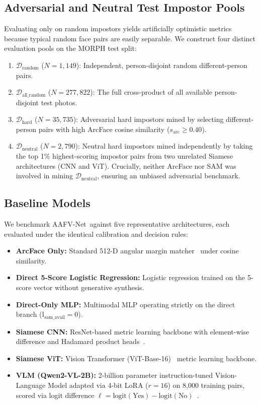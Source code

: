 \documentclass[10pt,journal,compsoc]{IEEEtran}
\newcommand{\sys}{AAFV-Net}
\begin{document}
\subsection{Adversarial and Neutral Test Impostor Pools}
Evaluating only on random impostors yields artificially optimistic metrics because typical random face pairs are easily separable. We construct four distinct evaluation pools on the MORPH test split:
\begin{enumerate}
    \item $\mathcal{D}_{\text{random}}$ ($N = 1{,}149$): Independent, person-disjoint random different-person pairs.
    \item $\mathcal{D}_{\text{all\_random}}$ ($N = 277{,}822$): The full cross-product of all available person-disjoint test photos.
    \item $\mathcal{D}_{\text{hard}}$ ($N = 35{,}735$): Adversarial hard impostors mined by selecting different-person pairs with high ArcFace cosine similarity ($s_{\text{arc}} \ge 0.40$).
    \item $\mathcal{D}_{\text{neutral}}$ ($N = 2{,}790$): Neutral hard impostors mined independently by taking the top 1\% highest-scoring impostor pairs from two unrelated Siamese architectures (CNN and ViT). Crucially, neither ArcFace nor SAM was involved in mining $\mathcal{D}_{\text{neutral}}$, ensuring an unbiased adversarial benchmark.
\end{enumerate}

\subsection{Baseline Models}
We benchmark \sys\ against five representative architectures, each evaluated under the identical calibration and decision rules:
\begin{itemize}
    \item \textbf{ArcFace Only:} Standard 512-D angular margin matcher~\cite{deng2019arcface} under cosine similarity.
    \item \textbf{Direct 5-Score Logistic Regression:} Logistic regression trained on the 5-score vector without generative synthesis.
    \item \textbf{Direct-Only MLP:} Multimodal MLP operating strictly on the direct branch ($\mathbb{I}_{\text{sam\_avail}} = 0$).
    \item \textbf{Siamese CNN:} ResNet-based metric learning backbone with element-wise difference and Hadamard product heads~\cite{chopra2005siamese}.
    \item \textbf{Siamese ViT:} Vision Transformer (ViT-Base-16)~\cite{dosovitskiy2021vit} metric learning backbone.
    \item \textbf{VLM (Qwen2-VL-2B):} 2-billion parameter instruction-tuned Vision-Language Model adapted via 4-bit LoRA ($r=16$) on 8,000 training pairs, scored via logit difference $\ell = \text{logit}(\text{Yes}) - \text{logit}(\text{No})$~\cite{wang2024qwen2vl}.
\end{itemize}
\end{document}
